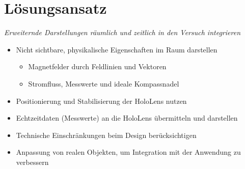 \part{Lösungsansatz}
\label{part:solution}
\begin{frame}[fragile]{}
	\textit{Erweiternde Darstellungen räumlich und zeitlich in den Versuch integrieren}
	\pause
	\begin{itemize}
		\item Nicht sichtbare, physikalische Eigenschaften im Raum darstellen
		\begin{itemize}[topsep=-5px]
			\setlength{\itemsep}{-5px}
			\item Magnetfelder durch Feldlinien und Vektoren
			\item Stromfluss, Messwerte und ideale Kompassnadel 
		\end{itemize}
		\pause
		\item Positionierung und Stabilisierung der HoloLens nutzen		
		\item Echtzeitdaten (Messwerte) an die HoloLens übermitteln und darstellen
		\item Technische Einschränkungen beim Design berücksichtigen
		\item Anpassung von realen Objekten, um Integration mit der Anwendung zu verbessern
	\end{itemize}
\end{frame}

